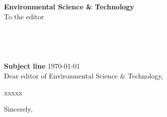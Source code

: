 \documentclass[11pt,a4paper]{letter} %
\def\opening#1{
\thispagestyle{empty}
{\centering\fromaddress \vspace{1in} \\} 
{\raggedright \toname \\ \toaddress \par} %
\vspace{2em}
\noindent
\textbf{Subject line} \hspace*{\fill}\today \\[2em]
\vspace{0.6in} %
\noindent #1 %
}
\begin{document}

\begin{letter}
{
\textbf{Environmental Science \& Technology} \\
\vspace{1em}
To the editor
}




\opening{Dear editor of Environmental Science \& Technology,}

xxxxx

\closing{Sincerely, }


\end{letter}
\end{document}

